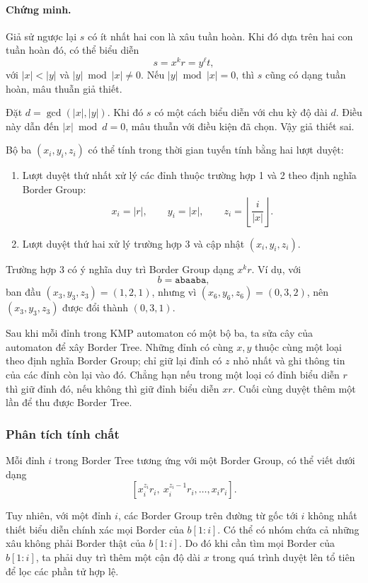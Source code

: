 \documentclass[11pt]{article}
\begin{document}
\paragraph{Chứng minh.}
Giả sử ngược lại \(s\) có ít nhất hai con là xâu tuần hoàn. Khi đó dựa trên hai
con tuần hoàn đó, có thể biểu diễn
\[
  s=x^kr=y^\ell t,
\]
với \(|x|<|y|\) và \(|y|\bmod |x|\ne 0\). Nếu \(|y|\bmod |x|=0\), thì \(s\)
cũng có dạng tuần hoàn, mâu thuẫn giả thiết.

Đặt \(d=\gcd(|x|,|y|)\). Khi đó \(s\) có một cách biểu diễn với chu kỳ độ dài
\(d\). Điều này dẫn đến \(|x|\bmod d=0\), mâu thuẫn với điều kiện đã chọn. Vậy
giả thiết sai.

Bộ ba \((x_i,y_i,z_i)\) có thể tính trong thời gian tuyến tính bằng hai lượt
duyệt:
\begin{enumerate}
  \item Lượt duyệt thứ nhất xử lý các đỉnh thuộc trường hợp 1 và 2 theo định
  nghĩa Border Group:
  \[
    x_i=|r|,\qquad y_i=|x|,\qquad z_i=\left\lfloor\frac{i}{|x|}\right\rfloor.
  \]
  \item Lượt duyệt thứ hai xử lý trường hợp 3 và cập nhật \((x_i,y_i,z_i)\).
\end{enumerate}

Trường hợp 3 có ý nghĩa duy trì Border Group dạng \(x^kr\). Ví dụ, với
\[
  b=\texttt{abaaba},
\]
ban đầu \((x_3,y_3,z_3)=(1,2,1)\), nhưng vì
\((x_6,y_6,z_6)=(0,3,2)\), nên \((x_3,y_3,z_3)\) được đổi thành
\((0,3,1)\).

Sau khi mỗi đỉnh trong KMP automaton có một bộ ba, ta sửa cây của automaton để
xây Border Tree. Những đỉnh có cùng \(x,y\) thuộc cùng một loại theo định nghĩa
Border Group; chỉ giữ lại đỉnh có \(z\) nhỏ nhất và ghi thông tin của các đỉnh
còn lại vào đó. Chẳng hạn nếu trong một loại có đỉnh biểu diễn \(r\) thì giữ
đỉnh đó, nếu không thì giữ đỉnh biểu diễn \(xr\). Cuối cùng duyệt thêm một lần
để thu được Border Tree.

\subsubsection{Phân tích tính chất}

Mỗi đỉnh \(i\) trong Border Tree tương ứng với một Border Group, có thể viết
dưới dạng
\[
  [x_i^{z_i}r_i,\ x_i^{z_i-1}r_i,\ldots,x_ir_i].
\]

Tuy nhiên, với một đỉnh \(i\), các Border Group trên đường từ gốc tới \(i\)
không nhất thiết biểu diễn chính xác mọi Border của \(b[1:i]\). Có thể có nhóm
chứa cả những xâu không phải Border thật của \(b[1:i]\). Do đó khi cần tìm mọi
Border của \(b[1:i]\), ta phải duy trì thêm một cận độ dài \(x\) trong quá trình
duyệt lên tổ tiên để lọc các phần tử hợp lệ.
\end{document}
